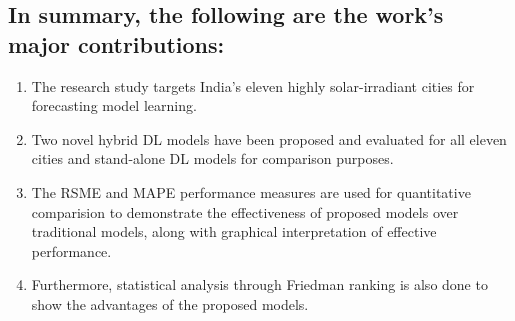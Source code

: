 \documentclass[a4paper,fleqn]{cas-sc}
\begin{document}
\subsection{In summary, the following are the work's major contributions:}
\begin{enumerate}
\item The research study targets India's eleven highly solar-irradiant cities for forecasting model learning.
\item  Two novel hybrid DL models have been proposed and evaluated for all eleven cities and stand-alone DL models for comparison purposes. 
\item The RSME and MAPE performance measures are used for quantitative comparision to demonstrate the effectiveness of proposed models over traditional models, along with graphical interpretation of effective performance. 
\item Furthermore, statistical analysis through Friedman ranking is also done to show the advantages of the proposed models. 
\end{enumerate}
\end{document}
